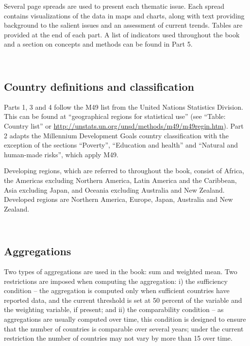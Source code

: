 Several page spreads are used to present each thematic issue. Each spread contains visualizations of the data in maps and charts, along with text providing background to the salient issues and an assessment of current trends. Tables are provided at the end of each part. A list of indicators used throughout the book and a section on concepts and methods can be found in Part 5.

\ 
\subsection{Country definitions and classification}

Parts 1, 3 and 4 follow the M49 list from the United Nations Statistics Division. This can be found at  “geographical regions for statistical use” (see “Table: Country list” or \url{http://unstats.un.org/unsd/methods/m49/m49regin.htm}). Part 2 adapts the Millennium Development Goals country classification with the exception of the sections “Poverty”, “Education and health” and “Natural and human-made risks”, which apply M49. 

Developing regions, which are referred to throughout the book, consist of Africa, the Americas excluding Northern America, Latin America and the Caribbean, Asia excluding Japan, and Oceania excluding Australia and New Zealand. Developed regions are Northern America, Europe, Japan, Australia and New Zealand. 

\ 
\subsection{Aggregations}

Two types of aggregations are used in the book: sum and weighted mean. Two restrictions are imposed when computing the aggregation: i) the sufficiency condition – the aggregation is computed only when sufficient countries have reported data, and the current threshold is set at 50 percent of the variable and the weighting variable, if present; and ii) the comparability condition – as aggregations are usually computed over time, this condition is designed to ensure that the number of countries is comparable over several years; under the current restriction the number of countries may not vary by more than 15 over time.

